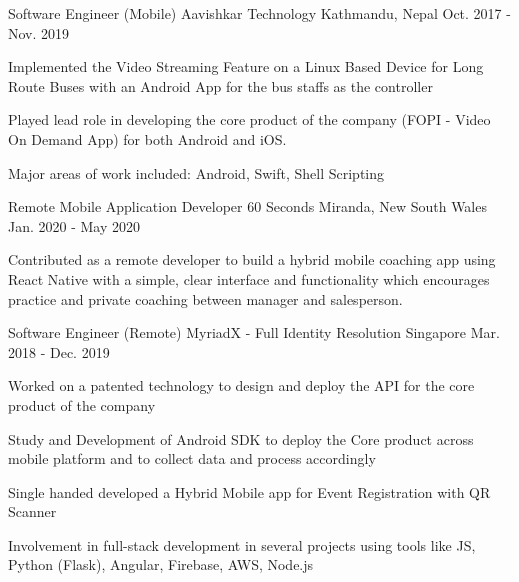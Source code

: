 
\begin{cventries}
  \cventry
    {Software Engineer (Mobile)} %
    {Aavishkar Technology} %
    {Kathmandu, Nepal} %
    {Oct. 2017 - Nov. 2019} %
    {
      \begin{cvitems} %
        \item {Implemented the Video Streaming Feature on a Linux Based Device for Long Route Buses with an Android App for the bus staffs as the controller}
        \item {Played lead role in developing the core product of the company (FOPI - Video On Demand App) for both Android and iOS.}
        \item {Major areas of work included: Android, Swift, Shell Scripting}
      \end{cvitems}
    }
    
  \cventry
    {Remote Mobile Application Developer} %
    {60 Seconds} %
    {Miranda, New South Wales} %
    {Jan. 2020 - May 2020} %
    {
      \begin{cvitems} %
        \item {Contributed as a remote developer to build a hybrid mobile coaching app using React Native with a simple, clear interface and functionality which encourages practice and private coaching between manager and salesperson.}
      \end{cvitems}
    }

  \cventry
    {Software Engineer (Remote)} %
    {MyriadX - Full Identity Resolution} %
    {Singapore} %
    {Mar. 2018 - Dec. 2019} %
    {
      \begin{cvitems} %
        \item {Worked on a patented technology to design and deploy the API for the core product of the company}
        \item {Study and Development of Android SDK to deploy the Core product across mobile platform and to collect data and process accordingly}
        \item {Single handed developed a Hybrid Mobile app for Event Registration with QR Scanner}
        \item {Involvement in full-stack development in several projects using tools like JS, Python (Flask), Angular, Firebase, AWS, Node.js}
      \end{cvitems}
    }


\end{cventries}
